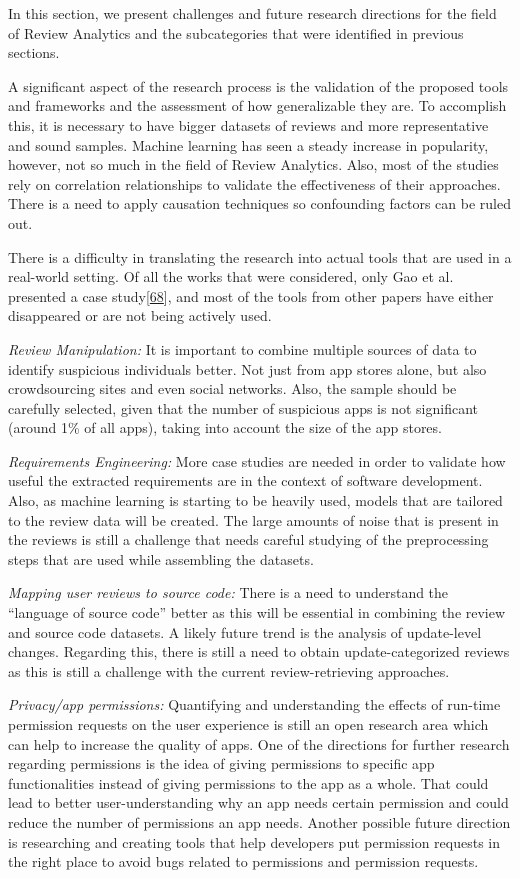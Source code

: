 \documentclass[]{book}
\begin{document}
In this section, we present challenges and future research directions
for the field of Review Analytics and the subcategories that were
identified in previous sections.

A significant aspect of the research process is the validation of the
proposed tools and frameworks and the assessment of how generalizable
they are. To accomplish this, it is necessary to have bigger datasets of
reviews and more representative and sound samples. Machine learning has
seen a steady increase in popularity, however, not so much in the field
of Review Analytics. Also, most of the studies rely on correlation
relationships to validate the effectiveness of their approaches. There
is a need to apply causation techniques so confounding factors can be
ruled out.

There is a difficulty in translating the research into actual tools that
are used in a real-world setting. Of all the works that were considered,
only Gao et al. presented a case
study{[}\protect\hyperlink{ref-gao2018online}{68}{]}, and most of the
tools from other papers have either disappeared or are not being
actively used.

\emph{Review Manipulation:} It is important to combine multiple sources
of data to identify suspicious individuals better. Not just from app
stores alone, but also crowdsourcing sites and even social networks.
Also, the sample should be carefully selected, given that the number of
suspicious apps is not significant (around 1\% of all apps), taking into
account the size of the app stores.

\emph{Requirements Engineering:} More case studies are needed in order
to validate how useful the extracted requirements are in the context of
software development. Also, as machine learning is starting to be
heavily used, models that are tailored to the review data will be
created. The large amounts of noise that is present in the reviews is
still a challenge that needs careful studying of the preprocessing steps
that are used while assembling the datasets.

\emph{Mapping user reviews to source code:} There is a need to
understand the ``language of source code'' better as this will be
essential in combining the review and source code datasets. A likely
future trend is the analysis of update-level changes. Regarding this,
there is still a need to obtain update-categorized reviews as this is
still a challenge with the current review-retrieving approaches.

\emph{Privacy/app permissions:} Quantifying and understanding the
effects of run-time permission requests on the user experience is still
an open research area which can help to increase the quality of apps.
One of the directions for further research regarding permissions is the
idea of giving permissions to specific app functionalities instead of
giving permissions to the app as a whole. That could lead to better
user-understanding why an app needs certain permission and could reduce
the number of permissions an app needs. Another possible future
direction is researching and creating tools that help developers put
permission requests in the right place to avoid bugs related to
permissions and permission requests.
\end{document}

